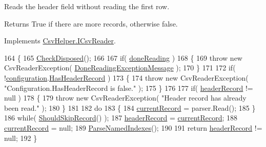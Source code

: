 Reads the header field without reading the first row. 

\begin{DoxyReturn}{Returns}
True if there are more records, otherwise false.
\end{DoxyReturn}


Implements \hyperlink{a00090_ac90848a26c5ce46d1acb7719e669897b}{Csv\-Helper.\-I\-Csv\-Reader}.


\begin{DoxyCode}
164         \{
165             \hyperlink{a00057_a6fa45a46ed1322dc1872ca2321b5edbc}{CheckDisposed}();
166 
167             \textcolor{keywordflow}{if}( \hyperlink{a00057_a04a4a668ae50f5383cdd2a1691bbd718}{doneReading} )
168             \{
169                 \textcolor{keywordflow}{throw} \textcolor{keyword}{new} CsvReaderException( \hyperlink{a00057_abea2bd0359f517019984de31f9d9fb96}{DoneReadingExceptionMessage} );
170             \}
171 
172             \textcolor{keywordflow}{if}( !\hyperlink{a00057_a695622911e45cbac8d67dcbd9a3e2967}{configuration}.\hyperlink{a00043_a9e439f90bfac500d24d6e2e731240439}{HasHeaderRecord} )
173             \{
174                 \textcolor{keywordflow}{throw} \textcolor{keyword}{new} CsvReaderException( \textcolor{stringliteral}{"Configuration.HasHeaderRecord is false."} );
175             \}
176 
177             \textcolor{keywordflow}{if}( \hyperlink{a00057_aa6e5fd8aa2961442ca1caf7a4ac54d65}{headerRecord} != null )
178             \{
179                 \textcolor{keywordflow}{throw} \textcolor{keyword}{new} CsvReaderException( \textcolor{stringliteral}{"Header record has already been read."} );
180             \}
181 
182             \textcolor{keywordflow}{do}
183             \{
184                 \hyperlink{a00057_ab2bfef15784add66e441c9d3a0d73751}{currentRecord} = parser.Read();
185             \}
186             \textcolor{keywordflow}{while}( \hyperlink{a00057_a3b8db0163b61e20d56ed8626e21338d6}{ShouldSkipRecord}() );
187             \hyperlink{a00057_aa6e5fd8aa2961442ca1caf7a4ac54d65}{headerRecord} = \hyperlink{a00057_ab2bfef15784add66e441c9d3a0d73751}{currentRecord};
188             \hyperlink{a00057_ab2bfef15784add66e441c9d3a0d73751}{currentRecord} = null;
189             \hyperlink{a00057_afc1150ed2f9ed7c9e87238e65a5e12e9}{ParseNamedIndexes}();
190 
191             \textcolor{keywordflow}{return} \hyperlink{a00057_aa6e5fd8aa2961442ca1caf7a4ac54d65}{headerRecord} != null;
192         \}
\end{DoxyCode}
